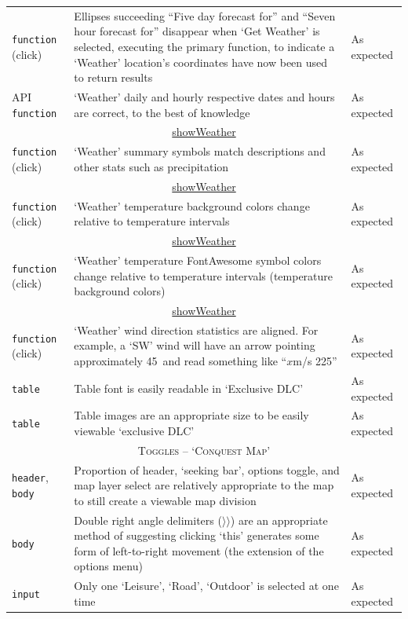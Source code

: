 \documentclass[11pt, english]{article}
\begin{document}
\begin{center}
\begin{longtable}{p{3cm}p{8cm}p{2cm}}
		\texttt{function} (click) & Ellipses succeeding ``Five day forecast for'' and ``Seven hour forecast for'' disappear when `Get Weather' is selected, executing the primary function, to indicate a `Weather' location's coordinates have now been used to return results & As expected\\
		API \texttt{function} & `Weather' daily and hourly respective dates and hours are correct, to the best of knowledge & As expected\\
		\multicolumn{3}{c}{\underline{showWeather}}\\
		\texttt{function} (click) & `Weather' summary symbols match descriptions and other stats such as precipitation & As expected\\
		\multicolumn{3}{c}{\underline{showWeather}}\\
		\texttt{function} (click) & `Weather' temperature background colors change relative to temperature intervals & As expected\\
		\multicolumn{3}{c}{\underline{showWeather}}\\
		\texttt{function} (click) & `Weather' temperature FontAwesome symbol colors change relative to temperature intervals (temperature background colors) & As expected\\
		\multicolumn{3}{c}{\underline{showWeather}}\\
		\texttt{function} (click) & `Weather' wind direction statistics are aligned. For example, a `SW' wind will have an arrow pointing approximately 45\textdegree\ and read something like ``$x$m/s \@ 225\textdegree'' & As expected\\
		\texttt{table} & Table font is easily readable in `Exclusive DLC' & As expected\\
		\texttt{table} & Table images are an appropriate size to be easily viewable `exclusive DLC' & As expected\\
		\hline
		\multicolumn{3}{c}{\textsc{Toggles -- `Conquest Map'}}\\
		\hline
		\texttt{header}, \texttt{body} & Proportion of header, `seeking bar', options toggle, and map layer select are relatively appropriate to the map to still create a viewable map division & As expected\\
		\texttt{body} & Double right angle delimiters ($\rangle\rangle$) are an appropriate method of suggesting clicking `this' generates some form of left-to-right movement (the extension of the options menu) & As expected\\
		\texttt{input} & Only one `Leisure', `Road', `Outdoor' is selected at one time & As expected\\

\end{longtable}
\end{center}
\end{document}
